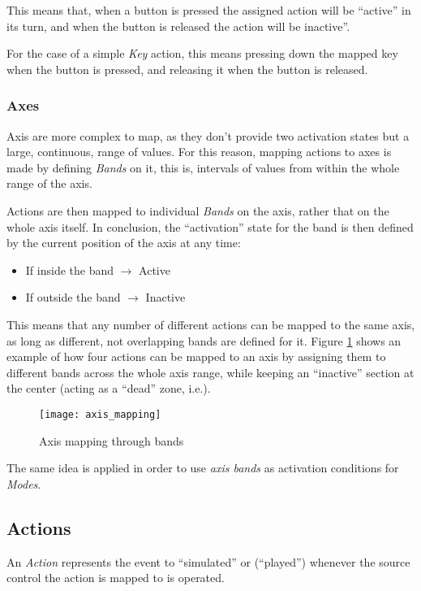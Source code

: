 This means that, when a button is pressed the assigned action will be ``active'' in its turn, and when the button is released the action will be inactive''. 

For the case of a simple \emph{Key} action, this means pressing down the mapped key when the button is pressed, and releasing it when the button is released.

\subsubsection{Axes}
Axis are more complex to map, as they don't provide two activation states but a large, continuous, range of values. For this reason, mapping actions to axes is made by defining \emph{Bands} on it, this is, intervals of values from within the whole range of the axis.

Actions are then mapped to individual \emph{Bands} on the axis, rather that on the whole axis itself. In conclusion, the ``activation'' state for the band is then defined by the current position of the axis at any time:
\begin{itemize}
	\item If inside the band $\rightarrow$ Active
	\item If outside the band $\rightarrow$ Inactive
\end{itemize}

This means that any number of different actions can be mapped to the same axis, as long as different, not overlapping bands are defined for it. Figure \ref{fig:axis_mapping} shows an example of how four actions can be mapped to an axis by assigning them to different bands across the whole axis range, while keeping an ``inactive'' section at the center (acting as a ``dead'' zone, i.e.).

\begin{figure}[htb]
\centering
\texttt{[image: axis\_mapping]}
\caption{Axis mapping through bands}
\label{fig:axis_mapping}
\end{figure}

The same idea is applied in order to use \emph{axis bands} as activation conditions for \emph{Modes}.


\subsection{Actions}
An \emph{Action} represents the event to ``simulated'' or (``played'') whenever the source control the action is mapped to is operated. 

